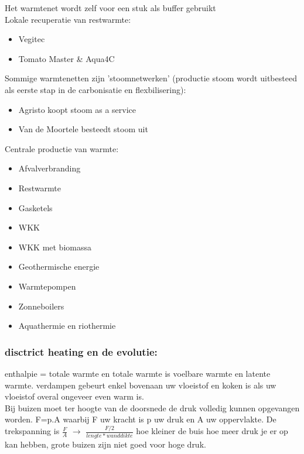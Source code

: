 \documentclass[12pt]{article}
\begin{document}
Het warmtenet wordt zelf voor een stuk als buffer gebruikt\\
Lokale recuperatie van restwarmte:\begin{itemize}
    \item Vegitec 
    \item Tomato Master \& Aqua4C
\end{itemize}
Sommige warmtenetten zijn 'stoomnetwerken' (productie stoom wordt uitbesteed als eerste stap in de carbonisatie en flexbilisering):\begin{itemize}
    \item Agristo koopt stoom as a service 
    \item Van de Moortele besteedt stoom uit
\end{itemize}
Centrale productie van warmte:\begin{itemize}
    \item Afvalverbranding 
    \item Restwarmte 
    \item Gasketels 
    \item WKK 
    \item WKK met biomassa 
    \item Geothermische energie 
    \item Warmtepompen 
    \item Zonneboilers 
    \item Aquathermie en riothermie
\end{itemize}
\subsubsection{disctrict heating en de evolutie:}
enthalpie = totale warmte en totale warmte is voelbare warmte en latente warmte. verdampen gebeurt enkel bovenaan uw vloeistof en koken is als uw vloeistof overal ongeveer even warm is.\bigskip \\
Bij buizen moet ter hoogte van de doorsnede de druk volledig kunnen opgevangen worden. F=p.A waarbij F uw kracht is p uw druk en A uw oppervlakte. De trekspanning is $\frac{F}{A}$ $\rightarrow$ $\frac{F/2}{lengte * wand dikte}$ hoe kleiner de buis hoe meer druk je er op kan hebben, grote buizen zijn niet goed voor hoge druk.
\end{document}
